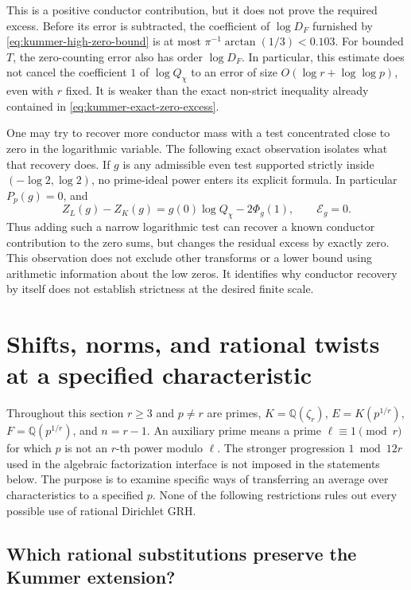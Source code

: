\documentclass[11pt]{article}
\theoremstyle{definition}
\theoremstyle{remark}
\begin{document}
This is a positive conductor contribution, but it does not
prove the required excess.  Before its error is subtracted,
the coefficient of $\log D_F$ furnished by
\eqref{eq:kummer-high-zero-bound} is at most
$\pi^{-1}\arctan(1/3)<0.103$.
For bounded $T$, the zero-counting error also has order
$\log D_F$.  In particular, this estimate does not cancel
the coefficient $1$ of $\log Q_\chi$ to an error of size
$O(\log r+\log\log p)$, even with $r$ fixed.
It is weaker than the exact non-strict inequality already
contained in \eqref{eq:kummer-exact-zero-excess}.

One may try to recover more conductor mass with a test
concentrated close to zero in the logarithmic variable.
The following exact observation isolates what that recovery
does.  If $g$ is any admissible even test supported strictly
inside $(-\log2,\log2)$, no prime-ideal power enters its
explicit formula.  In particular $P_p(g)=0$, and
\begin{equation}\label{eq:kummer-small-support-null}
 Z_L(g)-Z_K(g)=g(0)\log Q_\chi-2\Phi_g(1),
 \qquad \mathcal E_g=0.
\end{equation}
Thus adding such a narrow logarithmic test can recover a
known conductor contribution to the zero sums, but changes
the residual excess by exactly zero.  This observation does
not exclude other transforms or a lower bound using
arithmetic information about the low zeros.  It
identifies why conductor recovery by itself does not establish
strictness at the desired finite scale.

\section{Shifts, norms, and rational twists at a specified characteristic}
\label{sec:fixed-input-uniformization}

Throughout this section \(r\geq3\) and \(p\ne r\) are primes,
\(K=\mathbb Q(\zeta_r)\), \(E=K(p^{1/r})\), \(F=\mathbb Q(p^{1/r})\),
and \(n=r-1\). An auxiliary prime means a prime
\(\ell\equiv1\pmod r\) for which \(p\) is not an \(r\)-th power modulo
\(\ell\). The stronger progression \(1\bmod 12r\) used in the algebraic
factorization interface is not imposed in the statements below.
The purpose is to examine specific ways of transferring an average
over characteristics to a specified \(p\). None of the following
restrictions rules out every possible use of rational Dirichlet GRH.

\subsection{Which rational substitutions preserve the Kummer extension?}
\end{document}
